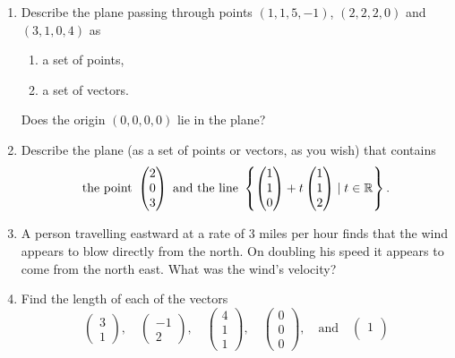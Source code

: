 \begin{enumerate}
 \item 
 Describe the plane passing through points $(1,1,5,-1)$, $(2,2,2,0)$ and
 $(3,1,0,4)$ as
 \begin{enumerate}[label=(\alph*)]
  \item a set of points,
  \item a set of vectors.
 \end{enumerate}
 Does the origin $(0,0,0,0)$ lie in the plane?
\item 
 Describe the plane (as a set of points or vectors, as you wish) that contains
 \[
  \text{the point }
  \begin{pmatrix}
   2\\
   0\\
   3
  \end{pmatrix}\text{ and the line }
  \left\{\begin{pmatrix}
   1\\
   1\\
   0
  \end{pmatrix}
  + t
  \begin{pmatrix}
   1\\
   1\\
   2
  \end{pmatrix}
  \mid t \in \mathbb{R} \right\}.
 \]
\item 
 A person travelling eastward at a rate of 3 miles per hour finds that the wind
 appears to blow directly from the north. On doubling his speed it appears to
 come from the north east. What was the wind's velocity?
\item 
 Find the length of each of the vectors
 \[
  \begin{pmatrix}
   3\\
   1
  \end{pmatrix}, \quad 
  \begin{pmatrix}
   -1\\
   2
  \end{pmatrix}, \quad 
  \begin{pmatrix}
   4\\
   1\\
   1
  \end{pmatrix}, \quad 
  \begin{pmatrix}
   0\\
   0\\
   0
  \end{pmatrix}, \quad \text{and} \quad 
  \begin{pmatrix}
   1\\

\end{pmatrix}\]
\end{enumerate}
